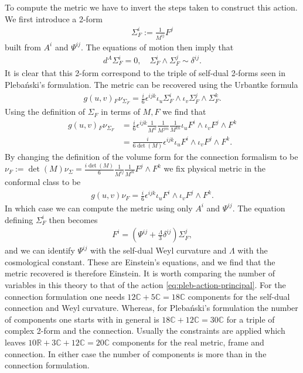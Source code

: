 \documentclass[10pt]{report}
\newcommand{\pleb}[0]{Pleba\'nski}
\newcommand{\urb}[0]{Urbantke}
\theoremstyle{definition}
\newcommand{\R}[0]{\mathbb{R}}
\newcommand{\C}[0]{\mathbb{C}}
\begin{document}
To compute the metric we have to invert the steps taken to construct this action. We first introduce a 2-form 
\begin{align}
    \Sigma^i_F := \frac{1}{M^{ij}} F^j
\end{align}
built from $A^i$ and $\Psi^{ij}$. The equations of motion then imply that 
\begin{align}
    d^A \Sigma^i_F = 0, \quad \Sigma^i_F \wedge \Sigma^j_F \sim \delta^{ij}.
\end{align}
It is clear that this 2-form correspond to the triple of self-dual 2-forms seen in \pleb{}'s formulation. The metric can be recovered using the \urb{} formula 
\begin{align}
    g(u,v){}_F \nu_{\Sigma_F} = \frac{i}{6}\epsilon^{ijk} \iota_u \Sigma^i_F \wedge \iota_v \Sigma^j_F \wedge \Sigma^k_F.
\end{align}
Using the definition of $\Sigma_F$ in terms of $M,F$ we find that 
\begin{align}
    g(u,v){}_F \nu_{\Sigma_F} & = \frac{i}{6} \epsilon^{ijk} \frac{1}{M^{il}} \frac{1}{M^{jm}} \frac{1}{M^{kn}} \iota_u F^i \wedge \iota_v F^j \wedge F^k \nonumber \\ & = \frac{i}{6\det(M)} \epsilon^{ijk} \iota_u F^i \wedge \iota_v F^j \wedge F^k.
\end{align}
By changing the definition of the volume form for the connection formalism to be $\nu_F := \det(M) \nu_\Sigma = \frac{i\det(M)}{6} \frac{1}{M^{ij}} \frac{1}{M^{ik}} F^j \wedge F^k$ we fix physical metric in the conformal class to be
\begin{align}
    g(u,v) \nu_F = \frac{i}{6} \epsilon^{ijk} \iota_u F^i \wedge \iota_v F^j \wedge F^k.
\end{align}
In which case we can compute the metric using only $A^i$ and $\Psi^{ij}$. The equation defining $\Sigma^i_F$ then becomes 
\begin{align}
    F^i = \left(\Psi^{ij} + \frac{\Lambda}{3}\delta^{ij}\right) \Sigma^j_F,
\end{align}
and we can identify $\Psi^{ij}$ with the self-dual Weyl curvature and $\Lambda$ with the cosmological constant. These are Einstein's equations, and we find that the metric recovered is therefore Einstein. It is worth comparing the number of variables in this theory to that of the action \cref{eq:pleb-action-principal}. For the connection formulation one needs $12\C + 5\C = 18\C$ components for the self-dual connection and Weyl curvature. Whereas, for \pleb{}'s formulation the number of components one starts with in general is $18\C + 12\C = 30\C$ for a triple of complex 2-form and the connection. Usually the constraints are applied which leaves $10\R + 3\C + 12\C = 20\C$ components for the real metric, frame and connection. In either case the number of components is more than in the connection formulation.
\end{document}
